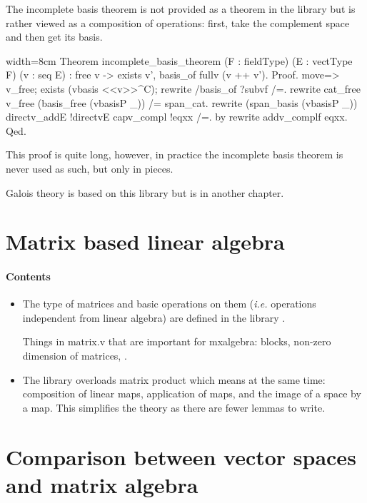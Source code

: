 The incomplete basis theorem is not provided as a theorem in the
library but is rather viewed as a composition of operations: first,
take the complement space and then get its basis.

\begin{coq}{}{width=8cm}
Theorem incomplete_basis_theorem (F : fieldType) (E : vectType F) (v : seq E) :
  free v -> exists v', basis_of fullv (v ++ v').
Proof.
move=> v_free; exists (vbasis <<v>>^C); rewrite /basis_of ?subvf /=.
rewrite cat_free v_free (basis_free (vbasisP _)) /= span_cat.
rewrite (span_basis (vbasisP _)) directv_addE !directvE capv_compl !eqxx /=.
by rewrite addv_complf eqxx.
Qed.
\end{coq}

This proof is quite long, however, in practice the incomplete basis
theorem is never used as such, but only in pieces.

Galois theory is based on this library but is in another chapter.

\section{Matrix based linear algebra}
\label{sec:matrix-based-linear}

\paragraph{Contents}

\begin{itemize}
\item The type of matrices and basic operations on them (\textit{i.e.}
  operations independent from linear algebra) are defined in the
  library .

  Things in matrix.v that are important for mxalgebra: blocks,
  non-zero dimension of matrices, .

\item The library  overloads matrix product
  which means at the same time: composition of linear maps,
  application of maps, and the image of a space by a map. This simplifies the
  theory as there are fewer lemmas to write.

\end{itemize}


\section{Comparison between vector spaces and matrix algebra}
\label{sec:comp-betw-vect}

